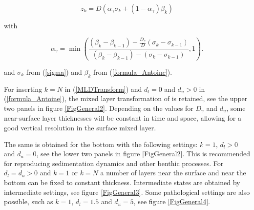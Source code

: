 \begin{equation}\label{HJVTrans}
z_k = D\left(\alpha_{\gamma} \sigma_k + (1-\alpha_{\gamma}) \beta_k\right) 
\end{equation}

with 

\begin{equation}\label{MLDTransform}
\alpha_{\gamma} = \min\left(\frac{
(\beta_k-\beta_{k-1})-\frac{D_{\gamma}}{D}(\sigma_k-\sigma_{k-1})}
{(\beta_k-\beta_{k-1})-(\sigma_k-\sigma_{k-1})},1\right).
\end{equation}

and $\sigma_k$ from (\ref{sigma}) and  $\beta_k$ from (\ref{formula_Antoine}). 

For inserting $k=N$ in (\ref{MLDTransform}) and $d_l=0$ and $d_u>0$
in (\ref{formula_Antoine}), 
the mixed layer transformation of 
\cite{BURCHARDea97} is retained, see the upper two
panels in figure \ref{FigGeneral2}. 
Depending on the values for 
$D_{\gamma}$ and  $d_u$, some near-surface layer thicknesses
will be constant in time and space, allowing for
a good vertical resolution in the surface mixed layer. 

The same is obtained for the bottom with the following settings:
$k=1$, $d_l>0$ and $d_u=0$, see the lower two
panels in figure \ref{FigGeneral2}. This is recommended for reproducing 
sedimentation dynamics and other benthic processes.
For $d_l=d_u>0$ and $k=1$ or $k=N$ a
number of layers near the surface and near the bottom can be
fixed to constant thickness. 
Intermediate states are obtained by intermediate settings,
see figure \ref{FigGeneral3}. 
Some pathological
settings are also possible, such as $k=1$, $d_l=1.5$ and $d_u=5$,
see figure \ref{FigGeneral4}. 


